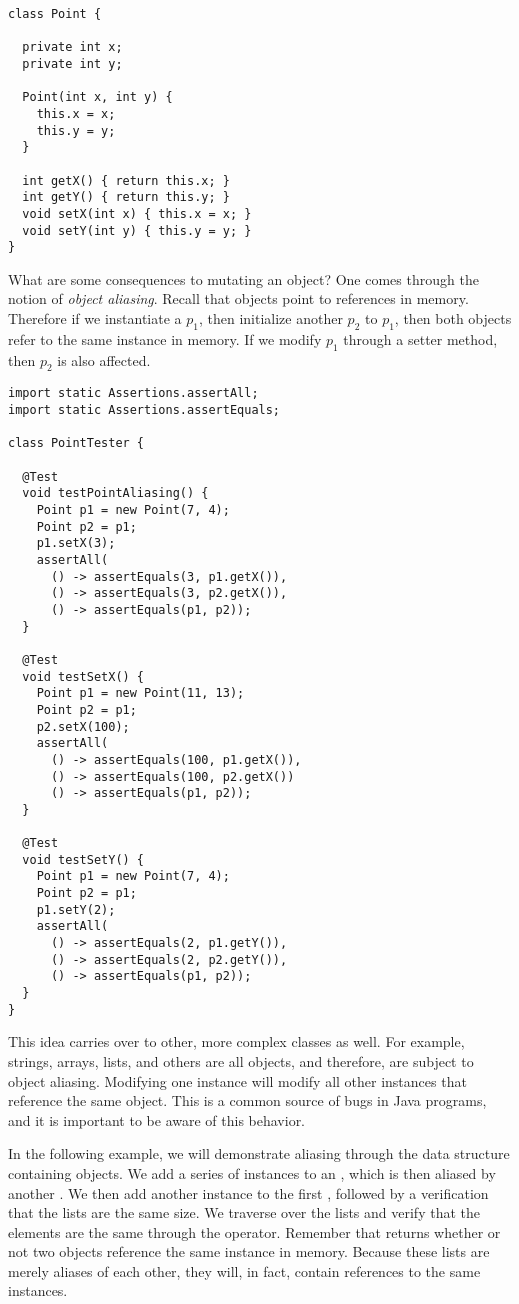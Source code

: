 \begin{lstlisting}[language=MyJava]
class Point {

  private int x;
  private int y;

  Point(int x, int y) { 
    this.x = x; 
    this.y = y; 
  }

  int getX() { return this.x; }
  int getY() { return this.y; }
  void setX(int x) { this.x = x; }
  void setY(int y) { this.y = y; }
}
\end{lstlisting}

What are some consequences to mutating an object? One comes through the notion of \emph{object aliasing}. Recall that objects point to references in memory. Therefore if we instantiate a  $p_1$, then initialize another  $p_2$ to $p_1$, then both objects refer to the same  instance in memory. If we modify $p_1$ through a setter method, then $p_2$ is also affected.

\begin{lstlisting}[language=MyJava]
import static Assertions.assertAll;
import static Assertions.assertEquals;

class PointTester {

  @Test
  void testPointAliasing() {
    Point p1 = new Point(7, 4);
    Point p2 = p1;
    p1.setX(3);
    assertAll(
      () -> assertEquals(3, p1.getX()),
      () -> assertEquals(3, p2.getX()),
      () -> assertEquals(p1, p2));
  }

  @Test
  void testSetX() {
    Point p1 = new Point(11, 13);
    Point p2 = p1;
    p2.setX(100);
    assertAll(
      () -> assertEquals(100, p1.getX()),
      () -> assertEquals(100, p2.getX())
      () -> assertEquals(p1, p2));
  }

  @Test
  void testSetY() {
    Point p1 = new Point(7, 4);
    Point p2 = p1;
    p1.setY(2);
    assertAll(
      () -> assertEquals(2, p1.getY()),
      () -> assertEquals(2, p2.getY()),
      () -> assertEquals(p1, p2));
  }
}
\end{lstlisting}

This idea carries over to other, more complex classes as well. For example, strings, arrays, lists, and others are all objects, and therefore, are subject to object aliasing. Modifying one  instance will modify all other  instances that reference the same object. This is a common source of bugs in Java programs, and it is important to be aware of this behavior. 

In the following example, we will demonstrate aliasing through the  data structure containing  objects. We add a series of  instances to an , which is then aliased by another . We then add another  instance to the first , followed by a verification that the lists are the same size. We traverse over the lists and verify that the elements are the same through the \ttt{==} operator. Remember that \ttt{==} returns whether or not two objects reference the same instance in memory. Because these lists are merely aliases of each other, they will, in fact, contain references to the same  instances.

